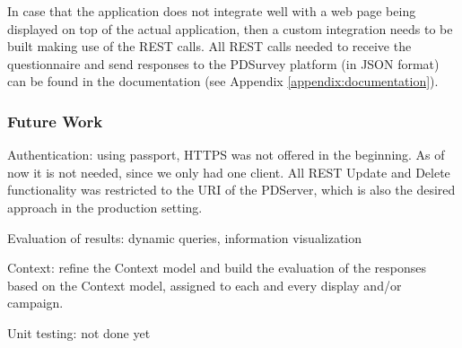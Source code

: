 	In case that the application does not integrate well with a web page being displayed on top of the actual application, then a custom integration needs to be built making use of the REST calls. All REST calls needed to receive the questionnaire and send responses to the PDSurvey platform (in JSON format) can be found in the documentation (see Appendix \ref{appendix:documentation}).



	\subsubsection{Future Work}


		Authentication: using passport, HTTPS was not offered in the beginning. As of now it is not needed, since we only had one client. All REST Update and Delete functionality was restricted to the URI of the PDServer, which is also the desired approach in the production setting.

		Evaluation of results: dynamic queries, information visualization

		Context: refine the Context model and build the evaluation of the responses based on the Context model, assigned to each and every display and/or campaign.

		Unit testing: not done yet

